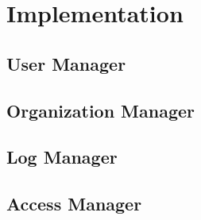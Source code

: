 \chapter{Implementation} 
\label{chapter:implementation}

\section{User Manager}

\section{Organization Manager}

\section{Log Manager}

\section{Access Manager}